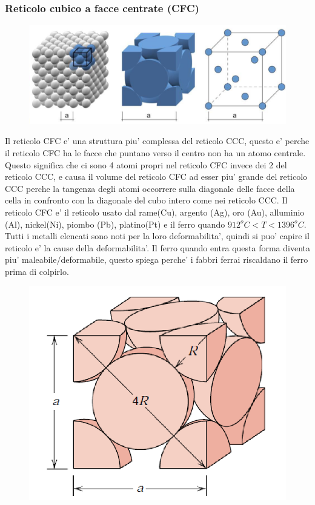 \documentclass{article}
\begin{document}
            \subsubsection{Reticolo cubico a facce centrate (CFC)}
                \begin{figure}[h!]
                    \centering
                    \includegraphics[width=\linewidth]{Reticolo CFC}
                \end{figure}
                Il reticolo CFC e' una struttura piu' complessa del reticolo CCC, questo e' perche il reticolo CFC ha le facce che puntano verso il centro non ha un atomo centrale.
                Questo significa che ci sono 4 atomi propri nel reticolo CFC invece dei 2 del reticolo CCC, e causa il volume del reticolo CFC ad esser piu' grande del reticolo CCC perche 
                la tangenza degli atomi occorrere sulla diagonale delle facce della cella in confronto con la diagonale del cubo intero come nei reticolo CCC.
                \newline \newline Il reticolo CFC e' il reticolo usato dal rame(Cu), argento (Ag), oro (Au), alluminio (Al), nickel(Ni), piombo (Pb), platino(Pt) e 
                il ferro quando $912^o C<T<1396^o C$.
                \newline \newline Tutti i metalli elencati sono noti per la loro deformabilita', quindi si puo' capire il reticolo e' la cause della deformabilita'.
                \newline \newline Il ferro quando entra questa forma diventa piu' maleabile/deformabile, questo spiega perche' i fabbri ferrai riscaldano il ferro 
                prima di colpirlo.
                \begin{figure}[h!]
                    \centering
                    \includegraphics[width=.5\linewidth]{CFC calcolo}
                \end{figure}
\end{document}
